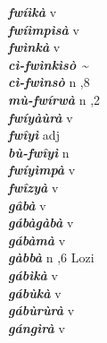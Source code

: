 \begin{multicols}{2}
{{\bfseries\itshape fwíìkà}} \relax  v  \relax   \relax  {} \relax   \relax  \\
{{\bfseries\itshape fwíìmpìsà}} \relax  v  \relax   \relax  {} \relax   \relax  \\
{{\bfseries\itshape fwìnkà}} \relax  v  \relax   \relax  {} \relax   \relax  \\
{{\bfseries\itshape cì-fwìnkìsò {\textasciitilde} \\
cì-fwìnsò}} \relax  n  ,8  \relax   \relax  \\
{{\bfseries\itshape mù-fwírwà}} \relax  n  ,2  \relax   \relax  \\
{{\bfseries\itshape fwíyàùrà}} \relax  v  \relax   \relax  {} \relax  \\
{{\bfseries\itshape fwîyì}} \relax  adj  \relax   \relax  {} \relax   \relax  \\
{{\bfseries\itshape bù-fwîyì}} \relax  n   \relax  {} \relax   \relax  \\
{{\bfseries\itshape fwíyìmpà}} \relax  v  \relax   \relax  {} \relax   \relax  \\
{{\bfseries\itshape fwîzyà}} \relax  v  \relax   \relax  {} \relax   \relax  \\
{{\bfseries\itshape gâbà}} \relax  v  \relax   \relax  {} \relax   \relax  \\
{{\bfseries\itshape gábàgàbà}} \relax  v  \relax   \relax  {} \relax   \relax  \\
{{\bfseries\itshape gábàmà}} \relax  v  \relax   \relax  {} \relax   \relax  \\
{{\bfseries\itshape gàbbà}} \relax  n  ,6  \relax  Lozi \relax  \\
{{\bfseries\itshape gábìkà}} \relax  v  \relax  {} \relax   \relax  \\
{{\bfseries\itshape gábùkà}} \relax  v  \relax   \relax  {} \relax   \relax  \\
{{\bfseries\itshape gábùrùrà}} \relax  v  \relax   \relax  {} \relax   \relax  \\
{{\bfseries\itshape gángìrà}} \relax  v  \relax   \relax  {} \relax   \relax  \\

\end{multicols}
